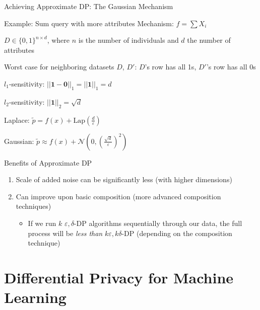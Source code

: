 \documentclass[12pt,aspectratio=169]{beamer}
\begin{document}
\begin{frame}{Achieving Approximate DP: The Gaussian Mechanism}

\begin{block}{Example: Sum query with more attributes}
Mechanism: $f = \sum X_i$

$D \in \{0, 1\}^{n \times d}$, where $n$ is the number of individuals and $d$ the number of attributes

Worst case for neighboring datasets $D$, $D'$: $D$'s row has all 1s, $D'$'s row has all 0s

$l_1$-sensitivity: $||\mathbf{1} - \mathbf{0}||_1 = ||\mathbf{1}||_1 = d$

$l_2$-sensitivity: $||\mathbf{1}||_2 = \sqrt{d}$

Laplace: $\tilde{p} = f(x) + \text{Lap}(\frac{d}{\varepsilon})$

Gaussian: $\tilde{p} \approx f(x) + \mathcal{N}(0, (\frac{\sqrt{d}}{\varepsilon})^2)$

\end{block}

\end{frame}

\begin{frame}{Benefits of Approximate DP}

\begin{enumerate}
    \item Scale of added noise can be significantly less (with higher dimensions)
    \item Can improve upon basic composition (more advanced composition techniques)
    \begin{itemize}
        \item If we run $k$ $\varepsilon, \delta$-DP algorithms sequentially through our data, the full process will be \textit{less than} $k\varepsilon, k\delta$-DP (depending on the composition technique)
    \end{itemize}
\end{enumerate}

\end{frame}


\section{Differential Privacy for Machine Learning}
\end{document}
